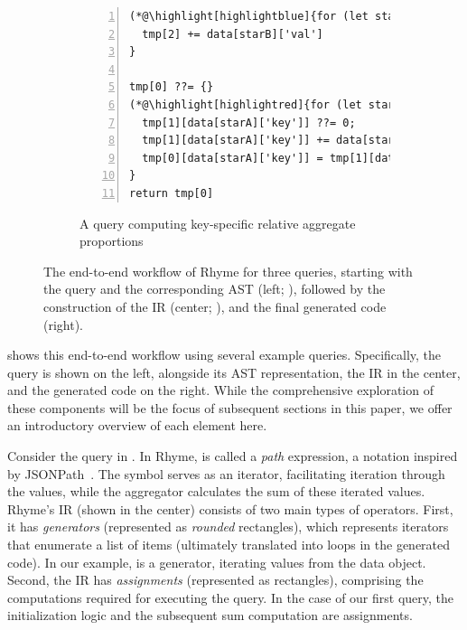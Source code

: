 \documentclass[runningheads]{llncs}
\newcommand{\lang}{Rhyme}
\begin{document}
\begin{figure}[t!]
\begin{subfigure}{\textwidth}
\begin{minipage}{0.38\textwidth}
\begin{lstlisting}[style=JavaScriptTiny, columns=flexible, numbers=left, xleftmargin=2pt]
(*@\highlight[highlightblue]{for (let starB in data)}@*) {  // loop hoisted!
  tmp[2] += data[starB]['val']
}

tmp[0] ??= {}
(*@\highlight[highlightred]{for (let starA in data)}@*) {
  tmp[1][data[starA]['key']] ??= 0;
  tmp[1][data[starA]['key']] += data[starA]['val']
  tmp[0][data[starA]['key']] = tmp[1][data[starA]['key']] / tmp[2] (*@\label{line:deps}@*)
}
return tmp[0]
\end{lstlisting}
\end{minipage}
\vspace{-2mm}
\caption{A query computing key-specific 
relative aggregate proportions
}\label{fig:intro_q3}
\end{subfigure}
\vspace{-2mm}
\caption{
The end-to-end workflow of \lang{} for three queries, starting with the query
and the corresponding AST (left; ),
followed by the construction of the IR (center; ), and the final generated code (right).
}\label{fig:intro} 
\vspace{-7mm}
\end{figure}

 shows this end-to-end workflow using several example queries.
Specifically, the query is shown on the left, alongside its AST representation,
the IR in the center, and the generated code on the right.
While the comprehensive exploration of these components will be the focus of
subsequent sections in this paper, we offer an introductory overview of each
element here.

Consider the query in .
In \lang{}, 
 is called a \emph{path} expression, a notation inspired by
JSONPath~\cite{jsonpath}.
The \inline{*} symbol serves as an iterator, facilitating iteration through
the  values, while the aggregator  calculates the sum of
these iterated values.
\lang{}'s IR (shown in the center) consists of two main types of operators.
First, it has \emph{generators} (represented as \emph{rounded} rectangles),
which represents iterators
that enumerate a list of items (ultimately translated into loops in
the generated code).
In our example,  is a generator, iterating values from the data object.
Second, the IR has \emph{assignments} (represented as rectangles), comprising the
computations required for executing the query.
In the case of our first query, the initialization logic  and
the subsequent sum computation  are assignments.
\end{document}
